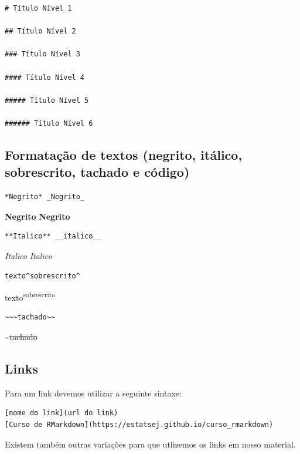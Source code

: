 \documentclass[
]{book}
\begin{document}
\begin{verbatim}
# Título Nível 1

## Título Nível 2

### Título Nível 3

#### Título Nível 4

##### Título Nível 5

###### Título Nível 6
\end{verbatim}

\hypertarget{formatauxe7uxe3o-de-textos-negrito-ituxe1lico-sobrescrito-tachado-e-cuxf3digo}{%
\subsection{Formatação de textos (negrito, itálico, sobrescrito, tachado e código)}\label{formatauxe7uxe3o-de-textos-negrito-ituxe1lico-sobrescrito-tachado-e-cuxf3digo}}

\begin{verbatim}
*Negrito* _Negrito_
\end{verbatim}

\textbf{Negrito} \textbf{Negrito}

\begin{verbatim}
**Italico** __italico__
\end{verbatim}

\emph{Italico} \emph{Italico}

\begin{verbatim}
texto^sobrescrito^
\end{verbatim}

texto\textsuperscript{sobrescrito}

\begin{verbatim}
~~~tachado~~
\end{verbatim}

\textasciitilde{}\sout{tachado}

\hypertarget{links}{%
\subsection{Links}\label{links}}

Para um link devemos utilizar a seguinte sintaxe:

\begin{verbatim}
[nome do link](url do link)
[Curso de RMarkdown](https://estatsej.github.io/curso_rmarkdown)
\end{verbatim}

Existem também outras variações para que utlizemos os links em nosso material.
\end{document}
